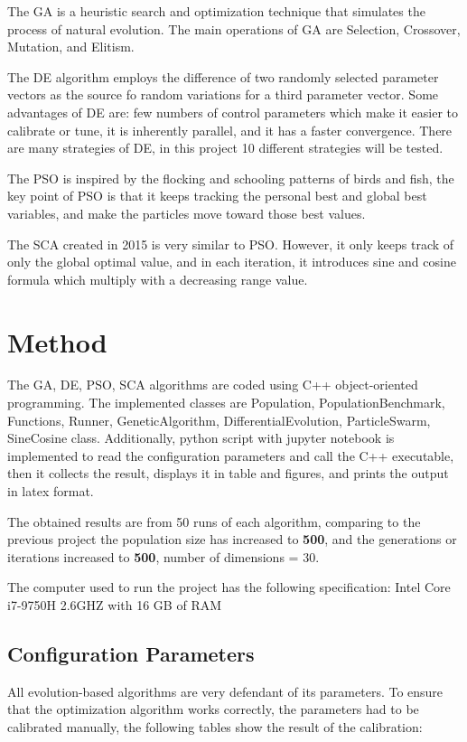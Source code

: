 \documentclass[12pt]{article}
\begin{document}
    The GA is a heuristic search and optimization technique that simulates the process of natural evolution. The main operations of GA are Selection, Crossover, Mutation, and Elitism.
    
    The DE algorithm employs the difference of two randomly selected parameter vectors as the source fo random variations for a third parameter vector. Some advantages of DE are: few numbers of control parameters which make it easier to calibrate or tune, it is inherently parallel, and it has a faster convergence. 
    There are many strategies of DE, in this project 10 different strategies will be tested.
    
    
    The PSO is inspired by the flocking and schooling patterns of birds and fish, the key point of PSO is that it keeps tracking the personal best and global best variables, and make the particles move toward those best values.
    
    The SCA created in 2015 is very similar to PSO. However, it only keeps track of only the global optimal value, and in each iteration, it introduces sine and cosine formula which multiply with a decreasing range value.
     


    
    \section{Method}
    
The GA, DE, PSO, SCA algorithms are coded using C++ object-oriented programming. The implemented classes are Population, PopulationBenchmark,  Functions, Runner, GeneticAlgorithm, DifferentialEvolution, ParticleSwarm, SineCosine class. Additionally, python script with jupyter notebook is implemented to read the configuration parameters and call the C++ executable, then it collects the result, displays it in table and figures, and prints the output in latex format.
    
    The obtained results are from 50 runs of each algorithm, comparing to the previous project the population size has increased to \textbf{500}, and the generations or iterations increased to \textbf{500}, number of dimensions = 30.

The computer used to run the project has the following specification: Intel Core i7-9750H 2.6GHZ with 16 GB of RAM

  
      
\subsection{Configuration Parameters}
All evolution-based algorithms are very defendant of its parameters. To ensure that the optimization algorithm works correctly,  the parameters had to be calibrated manually,
the following tables show the result of the calibration:
\end{document}
